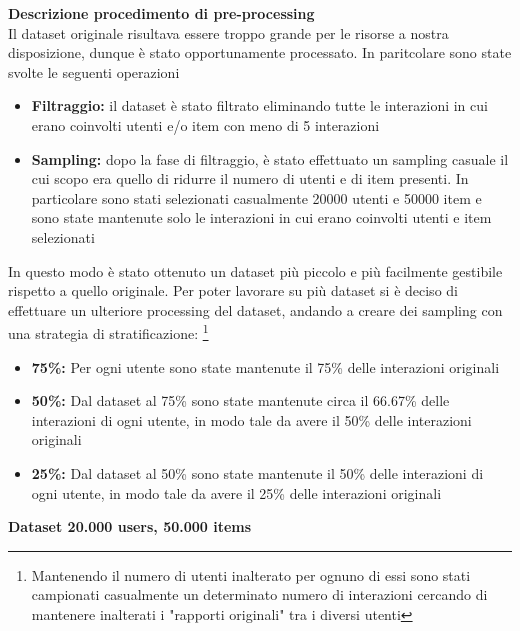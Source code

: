 \noindent\textbf{Descrizione procedimento di pre-processing}\\


\noindent Il dataset originale risultava essere troppo grande per le risorse a nostra disposizione, dunque è stato opportunamente processato. In paritcolare sono state svolte le seguenti operazioni
\begin{itemize}
    \item \textbf{Filtraggio:} il dataset è stato filtrato eliminando tutte le interazioni in cui erano coinvolti utenti e/o item con meno di 5 interazioni
    \item \textbf{Sampling:} dopo la fase di filtraggio, è stato effettuato un sampling casuale il cui scopo era quello di ridurre il numero di utenti e di item presenti. In particolare sono stati selezionati casualmente 20000 utenti e 50000 item e sono state mantenute solo le interazioni in cui erano coinvolti utenti e item selezionati
\end{itemize}

\noindent In questo modo è stato ottenuto un dataset più piccolo e più facilmente gestibile rispetto a quello originale.
Per poter lavorare su più dataset si è deciso di effettuare un ulteriore processing del dataset, andando a creare dei sampling con una strategia di stratificazione: \footnote{{{Mantenendo il numero di utenti inalterato per ognuno di essi sono stati campionati casualmente un determinato numero di interazioni cercando di mantenere inalterati i "rapporti originali" tra i diversi utenti}}}{}
\begin{itemize}
    \item \textbf{75\%:} Per ogni utente sono state mantenute il 75\% delle interazioni originali
    \item \textbf{50\%:} Dal dataset al 75\% sono state mantenute circa il 66.67\% delle interazioni di ogni utente, in modo tale da avere il 50\% delle interazioni originali
    \item \textbf{25\%:} Dal dataset al 50\% sono state mantenute il 50\% delle interazioni di ogni utente, in modo tale da avere il 25\% delle interazioni originali
\end{itemize}


\noindent\textbf{Dataset 20.000 users, 50.000 items}

